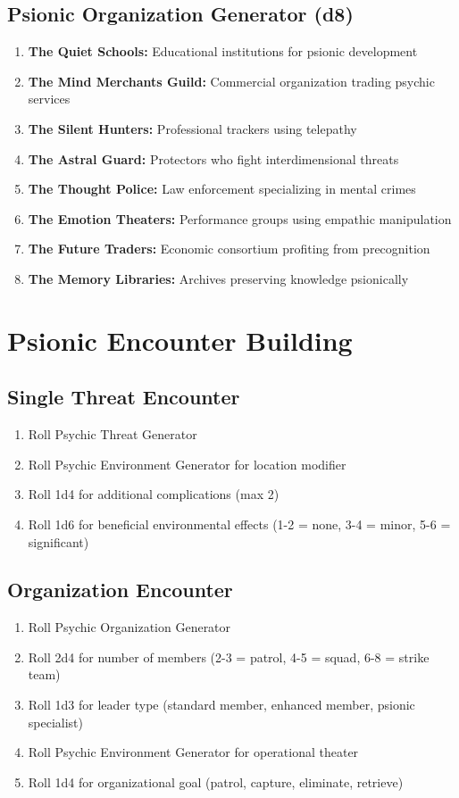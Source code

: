 \documentclass[11pt,twoside]{article}
\begin{document}
\subsection{Psionic Organization Generator (d8)}

\begin{enumerate}[leftmargin=*]
    \item \textbf{The Quiet Schools:} Educational institutions for psionic development
    \item \textbf{The Mind Merchants Guild:} Commercial organization trading psychic services
    \item \textbf{The Silent Hunters:} Professional trackers using telepathy
    \item \textbf{The Astral Guard:} Protectors who fight interdimensional threats
    \item \textbf{The Thought Police:} Law enforcement specializing in mental crimes
    \item \textbf{The Emotion Theaters:} Performance groups using empathic manipulation
    \item \textbf{The Future Traders:} Economic consortium profiting from precognition
    \item \textbf{The Memory Libraries:} Archives preserving knowledge psionically
\end{enumerate}

\section{Psionic Encounter Building}

\subsection{Single Threat Encounter}
\begin{enumerate}[leftmargin=*]
    \item Roll Psychic Threat Generator
    \item Roll Psychic Environment Generator for location modifier
    \item Roll 1d4 for additional complications (max 2)
    \item Roll 1d6 for beneficial environmental effects (1-2 = none, 3-4 = minor, 5-6 = significant)
\end{enumerate}

\subsection{Organization Encounter}
\begin{enumerate}[leftmargin=*]
    \item Roll Psychic Organization Generator
    \item Roll 2d4 for number of members (2-3 = patrol, 4-5 = squad, 6-8 = strike team)
    \item Roll 1d3 for leader type (standard member, enhanced member, psionic specialist)
    \item Roll Psychic Environment Generator for operational theater
    \item Roll 1d4 for organizational goal (patrol, capture, eliminate, retrieve)
\end{enumerate}
\end{document}
